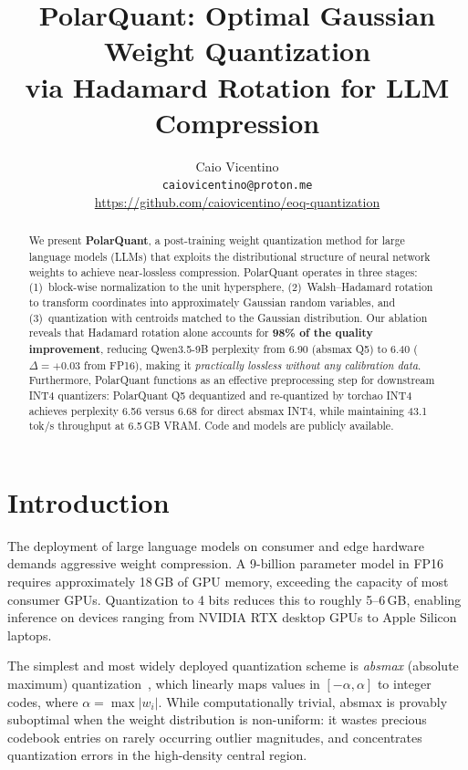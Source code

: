 \documentclass[10pt,twocolumn]{article}
\title{\textbf{PolarQuant: Optimal Gaussian Weight Quantization\\via Hadamard Rotation for LLM Compression}}
\author{
  Caio Vicentino\\
  \texttt{caiovicentino@proton.me}\\
  \url{https://github.com/caiovicentino/eoq-quantization}
}
\date{}
\begin{document}
\maketitle

\begin{abstract}
We present \textbf{PolarQuant}, a post-training weight quantization method for large language models (LLMs) that exploits the distributional structure of neural network weights to achieve near-lossless compression. PolarQuant operates in three stages: (1)~block-wise normalization to the unit hypersphere, (2)~Walsh--Hadamard rotation to transform coordinates into approximately Gaussian random variables, and (3)~quantization with centroids matched to the Gaussian distribution. Our ablation reveals that Hadamard rotation alone accounts for \textbf{98\% of the quality improvement}, reducing Qwen3.5-9B perplexity from 6.90 (absmax Q5) to 6.40 ($\Delta = +0.03$ from FP16), making it \emph{practically lossless without any calibration data}. Furthermore, PolarQuant functions as an effective preprocessing step for downstream INT4 quantizers: PolarQuant Q5 dequantized and re-quantized by torchao INT4 achieves perplexity 6.56 versus 6.68 for direct absmax INT4, while maintaining 43.1 tok/s throughput at 6.5\,GB VRAM. Code and models are publicly available.
\end{abstract}

\section{Introduction}
\label{sec:intro}

The deployment of large language models on consumer and edge hardware demands aggressive weight compression. A 9-billion parameter model in FP16 requires approximately 18\,GB of GPU memory, exceeding the capacity of most consumer GPUs. Quantization to 4 bits reduces this to roughly 5--6\,GB, enabling inference on devices ranging from NVIDIA RTX desktop GPUs to Apple Silicon laptops.

The simplest and most widely deployed quantization scheme is \emph{absmax} (absolute maximum) quantization~\cite{jacob2018quantization}, which linearly maps values in $[-\alpha, \alpha]$ to integer codes, where $\alpha = \max |w_i|$. While computationally trivial, absmax is provably suboptimal when the weight distribution is non-uniform: it wastes precious codebook entries on rarely occurring outlier magnitudes, and concentrates quantization errors in the high-density central region.
\end{document}
